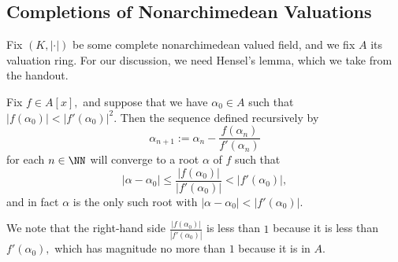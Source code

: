 \documentclass[../notes.tex]{subfiles}
\begin{document}
\subsection{Completions of Nonarchimedean Valuations}
Fix $(K,|\cdot|)$ be some complete nonarchimedean valued field, and we fix $A$ its valuation ring. For our discussion, we need Hensel's lemma, which we take from the handout.
\begin{lemma}[Hensel]
	Fix $f\in A[x],$ and suppose that we have $\alpha_0\in A$ such that $|f(\alpha_0)|<|f'(\alpha_0)|^2.$ Then the sequence defined recursively by
	\[\alpha_{n+1}:=\alpha_n-\frac{f(\alpha_n)}{f'(\alpha_n)}\]
	for each $n\in\NN$ will converge to a root $\alpha$ of $f$ such that
	\[|\alpha-\alpha_0|\le\frac{|f(\alpha_0)|}{|f'(\alpha_0)|}<|f'(\alpha_0)|,\]
	and in fact $\alpha$ is the only such root with $|\alpha-\alpha_0|<|f'(\alpha_0)|.$
\end{lemma}
\begin{remark}
	We note that the right-hand side $\frac{|f(\alpha_0)|}{|f'(\alpha_0)|}$ is less than $1$ because it is less than $f'(\alpha_0),$ which has magnitude no more than $1$ because it is in $A.$
\end{remark}
\end{document}
